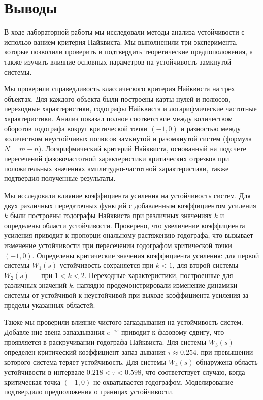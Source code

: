 \section{Выводы}
В ходе лабораторной работы мы исследовали методы анализа устойчивости с использо-ванием критерия Найквиста. Мы выполненили три эксперимента, которые позволили проверить и подтвердить теоретические предпоположения, а также изучить влияние основных параметров на устойчивость замкнутой системы.

Мы проверили справедливость классического критерия Найквиста на трех объектах. Для каждого объекта были построены карты нулей и полюсов, переходные характеристики, годографы Найквиста и логарифмические частотные характеристики. Анализ показал полное соответствие между количеством оборотов годографа вокруг критической точки $(-1, 0)$ и разностью между количеством неустойчивых полюсов замкнутой и разомкнутой систем (формула $N = m - n$). Логарифмический критерий Найквиста, основанный на подсчете пересечений фазовочастотной характеристики критических отрезков при положительных значениях амплитудно-частотной характеристики, также подтвердил полученные результаты.

Мы исследовали влияние коэффициента усиления на устойчивость систем. Для двух различных передаточных функций с добавленным коэффициентом усиления $k$ были построены годографы Найквиста при различных значениях $k$ и определены области устойчивости. Проверено, что увеличение коэффициента усиления приводит к пропорци-ональному растяжению годографа, что вызывает изменение устойчивости при пересечении годографом критической точки $(-1, 0)$. Определены критические значения коэффициента усиления: для первой системы $W_1(s)$ устойчивость сохраняется при $k < 1$, для второй системы $W_2(s)$ — при $1 < k < 2$. Переходные характеристики, построенные для различных значений $k$, наглядно продемонстрировали изменение динамики системы от устойчивой к неустойчивой при выходе коэффициента усиления за пределы указанных областей.

Также мы проверили влияние чистого запаздывания на устойчивость систем. Добавле-ние звена запаздывания $e^{-\tau s}$ приводит к фазовому сдвигу, что проявляется в раскручивании годографа Найквиста. Для системы $W_3(s)$ определен критический коэффициент запаз-дывания $\tau \approx 0.254$, при превышении которого система теряет устойчивость. Для системы $W_4(s)$ обнаружена область устойчивости в интервале $0.218 < \tau < 0.598$, что соответствует случаю, когда критическая точка $(-1, 0)$ не охватывается годографом. Моделирование подтвердило предположения о границах устойчивости.

